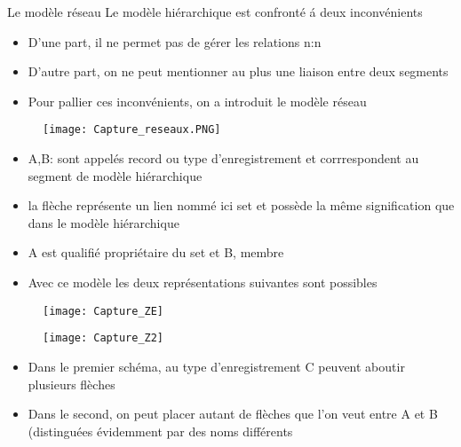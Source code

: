 \documentclass{beamer}
\begin{document}
   \begin{frame}{Le mod\`ele r\'eseau}
Le mod\`ele hi\'erarchique est confront\'e \'a deux inconv\'enients

    \begin{itemize}
        \item  D'une part, il ne permet pas de g\'erer les relations n:n
        \item D'autre part, on ne peut mentionner au plus une liaison entre deux segments
        \item Pour pallier ces inconv\'enients, on a introduit le mod\`ele r\'eseau
        
    \end{itemize}
    \end{frame}
      \begin{frame}
        

    \begin{figure}[h]
\centering	
 \texttt{[image: Capture\_reseaux.PNG]}
\end{figure}


    \end{frame}
    \begin{frame}
        
   
 \begin{itemize}
        \item  A,B: sont appel\'es record ou type d'enregistrement et corrrespondent au segment de mod\`ele hi\'erarchique
        \item la fl\`eche repr\'esente un lien nomm\'e ici set et poss\`ede la m\^eme signification que dans le mod\`ele hi\'erarchique
        \item A est qualifi\'e  propri\'etaire du set et B, membre
        \item Avec ce mod\`ele les deux repr\'esentations suivantes sont possibles
    \end{itemize}
    \end{frame}   
\begin{frame}
        

\begin{figure}[h]
\centering	
\texttt{[image: Capture\_ZE]}
\end{figure}

\begin{figure}[h]
\centering	
\texttt{[image: Capture\_Z2]}
\end{figure}
\end{frame}
\begin{frame}
        
   
 \begin{itemize}
        \item Dans le premier sch\'ema, au type d'enregistrement C peuvent aboutir plusieurs fl\`eches
        \item Dans le second, on peut placer autant de fl\`eches que l'on veut entre A et B (distingu\'ees \'evidemment par des noms diff\'erents
        
    \end{itemize}
    \end{frame}
\end{document}
